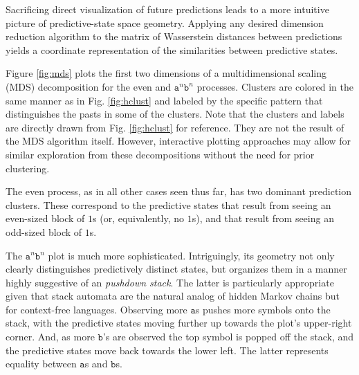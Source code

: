 \documentclass[sigconf, anonymous, review]{acmart}
\begin{document}
Sacrificing direct visualization of future predictions leads to a more
intuitive picture of predictive-state space geometry. Applying any desired
dimension reduction algorithm to the matrix of Wasserstein distances between
predictions yields a coordinate representation of the similarities between
predictive states.

Figure \ref{fig:mds} plots the first two dimensions of a multidimensional
scaling (MDS) decomposition \cite{Borg05a} for the even and
$\mathtt{a}^n\mathtt{b}^n$ processes. Clusters are colored in the same manner
as in Fig. \ref{fig:hclust} and labeled by the specific pattern that
distinguishes the pasts in some of the clusters. Note that the clusters and
labels are directly drawn from Fig. \ref{fig:hclust} for reference. They are
not the result of the MDS algorithm itself. However, interactive plotting
approaches may allow for similar exploration from these decompositions without
the need for prior clustering.

The even process, as in all other cases seen thus far, has two dominant
prediction clusters. These correspond to the predictive states that result
from seeing an even-sized block of $1$s (or, equivalently, no $1$s), and that
result from seeing an odd-sized block of $1$s.

The $\mathtt{a}^n\mathtt{b}^n$ plot is much more sophisticated. Intriguingly,
its geometry not only clearly distinguishes predictively distinct states, but
organizes them in a manner highly suggestive of an \emph{pushdown stack}. The
latter is particularly appropriate given that stack automata are the natural
analog of hidden Markov chains but for context-free languages. Observing more
$\mathtt{a}$s pushes more symbols onto the stack, with the predictive states
moving further up towards the plot's upper-right corner. And, as more
$\mathtt{b}$'s are observed the top symbol is popped off the stack, and the
predictive states move back towards the lower left. The latter represents
equality between $\mathtt{a}$s and $\mathtt{b}$s.
\end{document}

